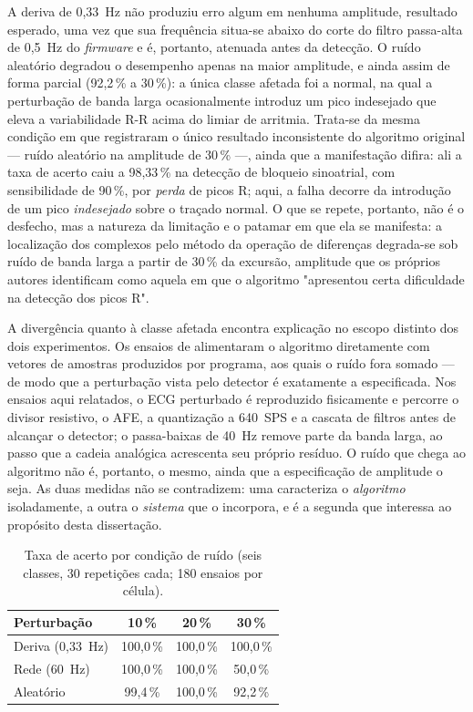A deriva de 0,33~Hz não produziu erro algum em nenhuma amplitude, resultado esperado, uma vez que sua frequência situa-se abaixo do corte do filtro passa-alta de 0,5~Hz do \textit{firmware} e é, portanto, atenuada antes da detecção. O ruído aleatório degradou o desempenho apenas na maior amplitude, e ainda assim de forma parcial (92,2\,\% a 30\,\%): a única classe afetada foi a normal, na qual a perturbação de banda larga ocasionalmente introduz um pico indesejado que eleva a variabilidade R-R acima do limiar de arritmia. Trata-se da mesma condição em que  registraram o único resultado inconsistente do algoritmo original --- ruído aleatório na amplitude de 30\,\% ---, ainda que a manifestação difira: ali a taxa de acerto caiu a 98,33\,\% na detecção de bloqueio sinoatrial, com sensibilidade de 90\,\%, por \emph{perda} de picos R; aqui, a falha decorre da introdução de um pico \emph{indesejado} sobre o traçado normal. O que se repete, portanto, não é o desfecho, mas a natureza da limitação e o patamar em que ela se manifesta: a localização dos complexos pelo método da operação de diferenças degrada-se sob ruído de banda larga a partir de 30\,\% da excursão, amplitude que os próprios autores identificam como aquela em que o algoritmo "apresentou certa dificuldade na detecção dos picos R".

A divergência quanto à classe afetada encontra explicação no escopo distinto dos dois experimentos. Os ensaios de  alimentaram o algoritmo diretamente com vetores de amostras produzidos por programa, aos quais o ruído fora somado --- de modo que a perturbação vista pelo detector é exatamente a especificada. Nos ensaios aqui relatados, o \acs{ECG} perturbado é reproduzido fisicamente e percorre o divisor resistivo, o \acs{AFE}, a quantização a 640~SPS e a cascata de filtros antes de alcançar o detector; o passa-baixas de 40~Hz remove parte da banda larga, ao passo que a cadeia analógica acrescenta seu próprio resíduo. O ruído que chega ao algoritmo não é, portanto, o mesmo, ainda que a especificação de amplitude o seja. As duas medidas não se contradizem: uma caracteriza o \emph{algoritmo} isoladamente, a outra o \emph{sistema} que o incorpora, e é a segunda que interessa ao propósito desta dissertação.

\begin{table}[htb]
\centering
\caption{Taxa de acerto por condição de ruído (seis classes, 30 repetições cada; 180 ensaios por célula).}
\label{tab:ruidoAcuracia}
\begin{tabular}{l c c c}
\hline
\textbf{Perturbação} & \textbf{10\,\%} & \textbf{20\,\%} & \textbf{30\,\%} \\
\hline
Deriva (0,33~Hz)  & 100,0\,\% & 100,0\,\% & 100,0\,\% \\
Rede (60~Hz)      & 100,0\,\% & 100,0\,\% & 50,0\,\%  \\
Aleatório         & 99,4\,\%  & 100,0\,\% & 92,2\,\%  \\
\hline
\end{tabular}
\end{table}

